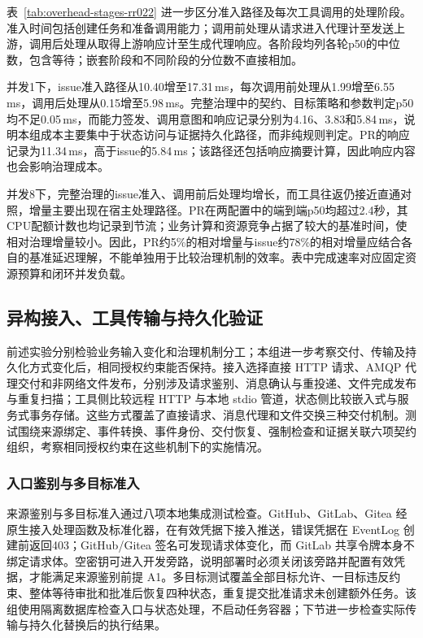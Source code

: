 表~\ref{tab:overhead-stages-rr022} 进一步区分准入路径及每次工具调用的处理阶段。准入时间包括创建任务和准备调用能力；调用前处理从请求进入代理计至发送上游，调用后处理从取得上游响应计至生成代理响应。各阶段均列各轮p50的中位数，包含等待；嵌套阶段和不同阶段的分位数不直接相加。



并发1下，issue准入路径从10.40增至17.31\,ms，每次调用前处理从1.99增至6.55\,ms，调用后处理从0.15增至5.98\,ms。完整治理中的契约、目标策略和参数判定p50均不足0.05\,ms，而能力签发、调用意图和响应记录分别为4.16、3.83和5.84\,ms，说明本组成本主要集中于状态访问与证据持久化路径，而非纯规则判定。PR的响应记录为11.34\,ms，高于issue的5.84\,ms；该路径还包括响应摘要计算，因此响应内容也会影响治理成本。

并发8下，完整治理的issue准入、调用前后处理均增长，而工具往返仍接近直通对照，增量主要出现在宿主处理路径。PR在两配置中的端到端p50均超过2.4秒，其CPU配额计数也均记录到节流；业务计算和资源竞争占据了较大的基准时间，使相对治理增量较小。因此，PR约5\%的相对增量与issue约78\%的相对增量应结合各自的基准延迟理解，不能单独用于比较治理机制的效率。表中完成速率对应固定资源预算和闭环并发负载。

\subsection{异构接入、工具传输与持久化验证}
\label{sec:heterogeneity-rr022}

前述实验分别检验业务输入变化和治理机制分工；本组进一步考察交付、传输及持久化方式变化后，相同授权约束能否保持。接入选择直接 HTTP 请求、AMQP 代理交付和非网络文件发布，分别涉及请求鉴别、消息确认与重投递、文件完成发布与重复扫描；工具侧比较远程 HTTP 与本地 stdio 管道，状态侧比较嵌入式与服务式事务存储。这些方式覆盖了直接请求、消息代理和文件交换三种交付机制。测试围绕来源绑定、事件转换、事件身份、交付恢复、强制检查和证据关联六项契约组织，考察相同授权约束在这些机制下的实施情况。

\subsubsection{入口鉴别与多目标准入}

来源鉴别与多目标准入通过八项本地集成测试检查。GitHub、GitLab、Gitea 经原生接入处理函数及标准化器，在有效凭据下接入推送，错误凭据在 EventLog 创建前返回403；GitHub/Gitea 签名可发现请求体变化，而 GitLab 共享令牌本身不绑定请求体。空密钥可进入开发旁路，说明部署时必须关闭该旁路并配置有效凭据，才能满足来源鉴别前提 A1。多目标测试覆盖全部目标允许、一目标违反约束、整体等待审批和批准后恢复四种状态，重复提交批准请求未创建额外任务。该组使用隔离数据库检查入口与状态处理，不启动任务容器；下节进一步检查实际传输与持久化替换后的执行结果。

